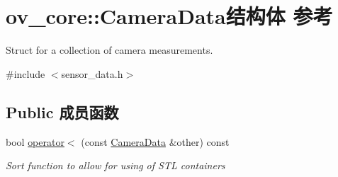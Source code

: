 \hypertarget{structov__core_1_1CameraData}{}\section{ov\+\_\+core\+:\+:Camera\+Data结构体 参考}
\label{structov__core_1_1CameraData}


Struct for a collection of camera measurements.  




{\ttfamily \#include $<$sensor\+\_\+data.\+h$>$}

\subsection*{Public 成员函数}
\begin{DoxyCompactItemize}
\item 
\mbox{\label{structov__core_1_1CameraData_a5f21a5ac4392c764574e289776adbf97}} 
bool \hyperlink{structov__core_1_1CameraData_a5f21a5ac4392c764574e289776adbf97}{operator$<$} (const \hyperlink{structov__core_1_1CameraData}{Camera\+Data} \&other) const
\begin{DoxyCompactList}\small\item\em Sort function to allow for using of S\+TL containers \end{DoxyCompactList}\end{DoxyCompactItemize}
